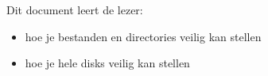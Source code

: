 Dit document leert de lezer:
\begin{itemize}
\item hoe je bestanden en directories veilig kan stellen
\item hoe je hele disks veilig kan stellen
\end{itemize}

